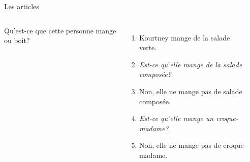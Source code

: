 \documentclass{beamer}
\begin{document}
  \begin{frame}{Les articles}
    \begin{columns}
        Qu'est-ce que cette personne mange ou boit?
        \begin{enumerate}
          \item<2-> Kourtney mange de la salade verte.
          \item<2-> \emph{Est-ce qu'elle mange de la salade composée?}
          \item<3-> Non, elle ne mange pas de salade composée.
          \item<3-> \emph{Est-ce qu'elle mange un croque-madame?}
          \item<4-> Non, elle ne mange pas de croque-madame.
        \end{enumerate}
        \begin{minipage}[c][0.6\textwidth]{\linewidth}
          \begin{center}
          \end{center}
        \end{minipage}
    \end{columns}
  \end{frame}

\end{document}
